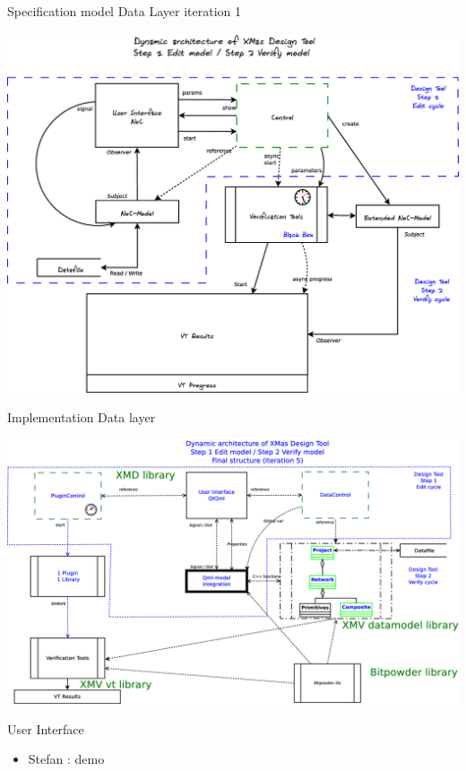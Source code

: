 \documentclass[11pt]{beamer}
\begin{document}
\begin{frame}{Specification model Data Layer iteration 1}

	\includegraphics[width=.95\linewidth]{pictures/1c-architecture-dynamic-1}

\end{frame}

\begin{frame}{Implementation Data layer}

	\includegraphics[width=.95\linewidth]{pictures/1c-architecture-dynamic-2}

\end{frame}

\begin{frame}{User Interface}

	\begin{itemize}
		\item Stefan : demo
	\end{itemize}

\end{frame}
\end{document}

